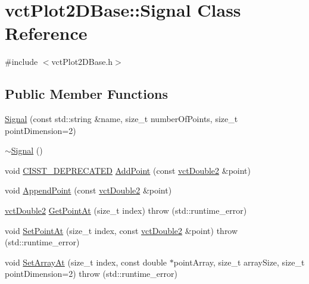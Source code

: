 \hypertarget{classvct_plot2_d_base_1_1_signal}{\section{vct\-Plot2\-D\-Base\-:\-:Signal Class Reference}
\label{classvct_plot2_d_base_1_1_signal}
}


{\ttfamily \#include $<$vct\-Plot2\-D\-Base.\-h$>$}

\subsection*{Public Member Functions}
\begin{DoxyCompactItemize}
\item 
\hyperlink{classvct_plot2_d_base_1_1_signal_ab095234489c14783246b6037ea6c1820}{Signal} (const std\-::string \&name, size\-\_\-t number\-Of\-Points, size\-\_\-t point\-Dimension=2)
\item 
\hyperlink{classvct_plot2_d_base_1_1_signal_a74fd6d127a4f44cabf148f7b7267e036}{$\sim$\-Signal} ()
\item 
void \hyperlink{cmn_portability_8h_a63da7164735f9501be651b1f2bbc0121}{C\-I\-S\-S\-T\-\_\-\-D\-E\-P\-R\-E\-C\-A\-T\-E\-D} \hyperlink{classvct_plot2_d_base_1_1_signal_a1f5b48d4843fef660afac788f09d20ab}{Add\-Point} (const \hyperlink{vct_fixed_size_vector_types_8h_afc0fdcc41cbe8b043747612501610812}{vct\-Double2} \&point)
\item 
void \hyperlink{classvct_plot2_d_base_1_1_signal_a05c35a4ab52fefa871268ef952d31e50}{Append\-Point} (const \hyperlink{vct_fixed_size_vector_types_8h_afc0fdcc41cbe8b043747612501610812}{vct\-Double2} \&point)
\item 
\hyperlink{vct_fixed_size_vector_types_8h_afc0fdcc41cbe8b043747612501610812}{vct\-Double2} \hyperlink{classvct_plot2_d_base_1_1_signal_a3d37044fdbd4cf336c04851a775be70c}{Get\-Point\-At} (size\-\_\-t index)  throw (std\-::runtime\-\_\-error)
\item 
void \hyperlink{classvct_plot2_d_base_1_1_signal_ae7234b9ab496f6af9713b34ecc80123a}{Set\-Point\-At} (size\-\_\-t index, const \hyperlink{vct_fixed_size_vector_types_8h_afc0fdcc41cbe8b043747612501610812}{vct\-Double2} \&point)  throw (std\-::runtime\-\_\-error)
\item 
void \hyperlink{classvct_plot2_d_base_1_1_signal_acac355be74456036634f204da1169c76}{Set\-Array\-At} (size\-\_\-t index, const double $\ast$point\-Array, size\-\_\-t array\-Size, size\-\_\-t point\-Dimension=2)  throw (std\-::runtime\-\_\-error)

\end{DoxyCompactItemize}
